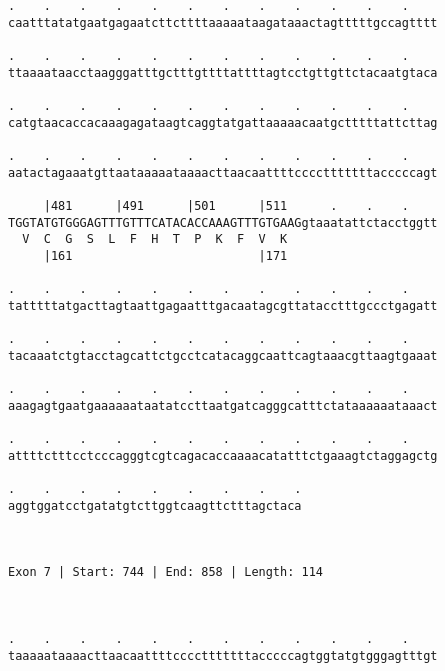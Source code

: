 \documentclass{article}
\begin{document}
\begin{Verbatim}
.    .    .    .    .    .    .    .    .    .    .    .    
caatttatatgaatgagaatcttcttttaaaaataagataaactagtttttgccagtttt
                                                            
.    .    .    .    .    .    .    .    .    .    .    .    
ttaaaataacctaagggatttgctttgttttattttagtcctgttgttctacaatgtaca
                                                            
.    .    .    .    .    .    .    .    .    .    .    .    
catgtaacaccacaaagagataagtcaggtatgattaaaaacaatgctttttattcttag
                                                            
.    .    .    .    .    .    .    .    .    .    .    .    
aatactagaaatgttaataaaaataaaacttaacaattttcccctttttttacccccagt
                                                            
     |481      |491      |501      |511      .    .    .    
TGGTATGTGGGAGTTTGTTTCATACACCAAAGTTTGTGAAGgtaaatattctacctggtt
  V  C  G  S  L  F  H  T  P  K  F  V  K                     
     |161                          |171                     
  
.    .    .    .    .    .    .    .    .    .    .    .    
tatttttatgacttagtaattgagaatttgacaatagcgttatacctttgccctgagatt
                                                            
.    .    .    .    .    .    .    .    .    .    .    .    
tacaaatctgtacctagcattctgcctcatacaggcaattcagtaaacgttaagtgaaat
                                                            
.    .    .    .    .    .    .    .    .    .    .    .    
aaagagtgaatgaaaaaataatatccttaatgatcagggcatttctataaaaaataaact
                                                            
.    .    .    .    .    .    .    .    .    .    .    .    
attttctttcctcccagggtcgtcagacaccaaaacatatttctgaaagtctaggagctg
                                                            
.    .    .    .    .    .    .    .    .
aggtggatcctgatatgtcttggtcaagttctttagctaca
                                         
                                         
 
Exon 7 | Start: 744 | End: 858 | Length: 114



.    .    .    .    .    .    .    .    .    .    .    .    
taaaaataaaacttaacaattttcccctttttttacccccagtggtatgtgggagtttgt
                                                            

\end{Verbatim}
\end{document}
